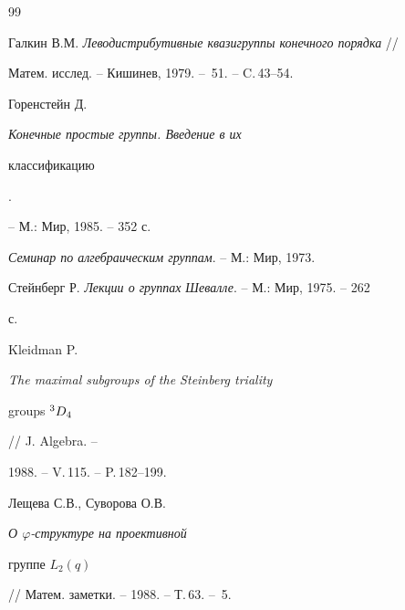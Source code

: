 \begin{thebibliography}{99} 


 




Галкин В.М. {\em Леводистрибутивные квазигруппы конечного порядка} // 


Матем. исслед. -- Кишинев, 1979. -- \No\,51. -- C.\,43--54. 




Горенстейн Д. {\em Конечные простые группы. Введение в их 


классификацию}. 


-- М.: Мир, 1985. -- 352 с. 




{\em Семинар по алгебраическим группам}. -- М.: Мир, 1973.




Стейнберг Р. {\em Лекции о группах Шевалле}. -- М.: Мир, 1975. -- 262 


с. 




Kleidman P. {\em The maximal subgroups of the Steinberg triality 


groups ${}^3D_4$} // J. Algebra. -- 


1988. -- V.\,115. -- P.\,182--199. 




Лещева С.В., Суворова О.В. {\em О $\varphi$-структуре на проективной 


группе $L_2(q)$} // Матем. заметки. -- 1988. -- Т.\,63. -- \No\,5. 


 


\end{thebibliography} 


 


\vskip 2cm 


 






 


\label{end} 


 


